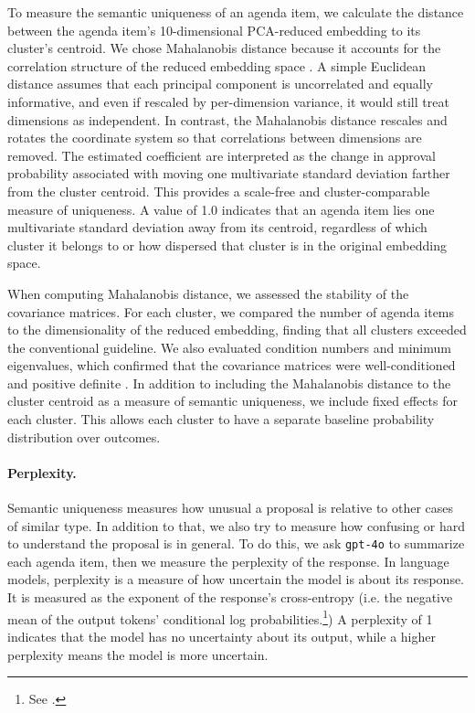 To measure the semantic uniqueness of an agenda item, we calculate the distance between the agenda item's 10-dimensional PCA-reduced embedding to its cluster's centroid. We chose Mahalanobis distance because it accounts for the correlation structure of the reduced embedding space \citep[p. 93]{rencher2012}. A simple Euclidean distance assumes that each principal component is uncorrelated and equally informative, and even if rescaled by per-dimension variance, it would still treat dimensions as independent. In contrast, the Mahalanobis distance rescales and rotates the coordinate system so that correlations between dimensions are removed. The estimated coefficient are interpreted as the change in approval probability associated with moving one multivariate standard deviation farther from the cluster centroid. This provides a scale-free and cluster-comparable measure of uniqueness. A value of 1.0 indicates that an agenda item lies one multivariate standard deviation away from its centroid, regardless of which cluster it belongs to or how dispersed that cluster is in the original embedding space. 

When computing Mahalanobis distance, we assessed the stability of the covariance matrices. For each cluster, we compared the number of agenda items to the dimensionality of the reduced embedding, finding that all clusters exceeded the conventional guideline. We also evaluated condition numbers and minimum eigenvalues, which confirmed that the covariance matrices were well-conditioned and positive definite \citep[p.~268]{aguinis2009}. In addition to including the Mahalanobis distance to the cluster centroid as a measure of semantic uniqueness, we include fixed effects for each cluster. This allows each cluster to have a separate baseline probability distribution over outcomes.

\paragraph{Perplexity.} Semantic uniqueness measures how unusual a proposal is relative to other cases of similar type. In addition to that, we also try to measure how confusing or hard to understand the proposal is in general. To do this, we ask \texttt{gpt-4o} to summarize each agenda item, then we measure the perplexity of the response. In language models, perplexity is a measure of how uncertain the model is about its response. It is measured as the exponent of the response's cross-entropy  (i.e. the negative mean of the output tokens' conditional log probabilities.\footnote{See \citet{jm2}.}) A perplexity of 1 indicates that the model has no uncertainty about its output, while a higher perplexity means the model is more uncertain. 

